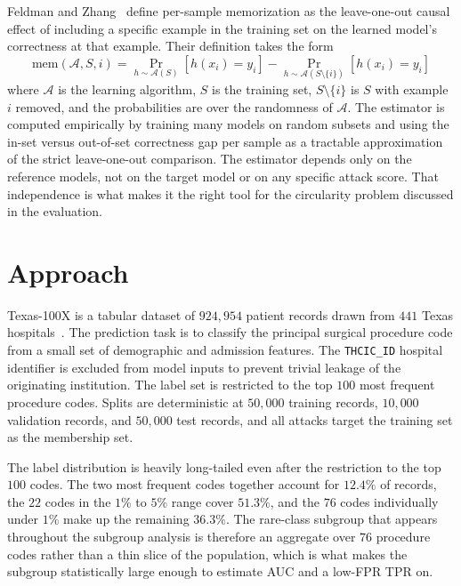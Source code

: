 \documentclass[conference]{IEEEtran}
\begin{document}
Feldman and Zhang~\cite{feldman2020} define per-sample memorization as the leave-one-out causal effect of including a specific example in the training set on the learned model's correctness at that example. Their definition takes the form
\begin{equation*}
  \mathrm{mem}(\mathcal{A}, S, i) = \Pr_{h \sim \mathcal{A}(S)}[h(x_i) = y_i] - \Pr_{h \sim \mathcal{A}(S \setminus \{i\})}[h(x_i) = y_i]
\end{equation*}
where $\mathcal{A}$ is the learning algorithm, $S$ is the training set, $S \setminus \{i\}$ is $S$ with example $i$ removed, and the probabilities are over the randomness of $\mathcal{A}$. The estimator is computed empirically by training many models on random subsets and using the in-set versus out-of-set correctness gap per sample as a tractable approximation of the strict leave-one-out comparison. The estimator depends only on the reference models, not on the target model or on any specific attack score. That independence is what makes it the right tool for the circularity problem discussed in the evaluation.

\section*{Approach}

Texas-100X is a tabular dataset of $924{,}954$ patient records drawn from $441$ Texas hospitals~\cite{texas100x}. The prediction task is to classify the principal surgical procedure code from a small set of demographic and admission features. The \texttt{THCIC\_ID} hospital identifier is excluded from model inputs to prevent trivial leakage of the originating institution. The label set is restricted to the top $100$ most frequent procedure codes. Splits are deterministic at $50{,}000$ training records, $10{,}000$ validation records, and $50{,}000$ test records, and all attacks target the training set as the membership set.

The label distribution is heavily long-tailed even after the restriction to the top $100$ codes. The two most frequent codes together account for $12.4\%$ of records, the $22$ codes in the $1\%$ to $5\%$ range cover $51.3\%$, and the $76$ codes individually under $1\%$ make up the remaining $36.3\%$. The rare-class subgroup that appears throughout the subgroup analysis is therefore an aggregate over $76$ procedure codes rather than a thin slice of the population, which is what makes the subgroup statistically large enough to estimate AUC and a low-FPR TPR on.
\end{document}
